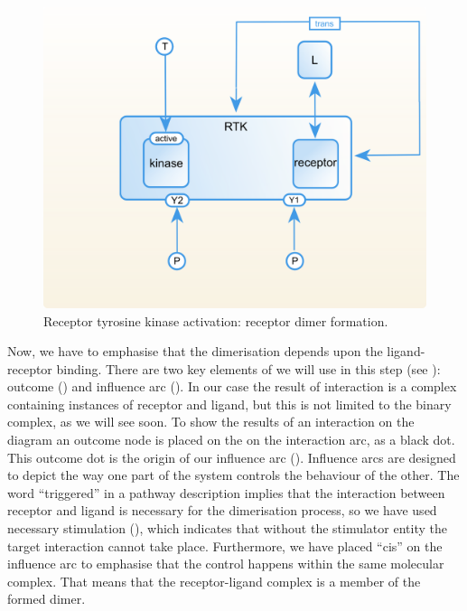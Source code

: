\begin{figure}[H]
  \centering
  \vspace*{-0.75em}
  \includegraphics[scale=0.75]{examples/rtk-dimerisation.png}
   \caption{Receptor tyrosine kinase activation: receptor dimer formation.}
  \label{fig:rtk-dimerisation}
\end{figure}

Now, we have to emphasise that the dimerisation depends upon the ligand-receptor binding. There are two key elements of \SBGNERLone we will use in this step (see ): outcome () and influence arc (). In our case the result of interaction is a complex containing instances of receptor and ligand, but this is not limited to the binary complex, as we will see soon. To show the results of an interaction on the diagram an outcome node is placed on the on the interaction arc, as a black dot. This outcome dot is the origin of our influence arc (). Influence arcs are designed to depict the way one part of the system controls the behaviour of the other. The word ``triggered'' in a pathway description implies that the interaction between receptor and ligand is necessary for the dimerisation process, so we have used necessary stimulation (), which indicates that without the stimulator entity the target interaction cannot take place. Furthermore, we have placed ``cis''  on the influence arc to emphasise that the control happens within the same molecular complex. That means that the receptor-ligand complex is a member of the formed dimer.
 
